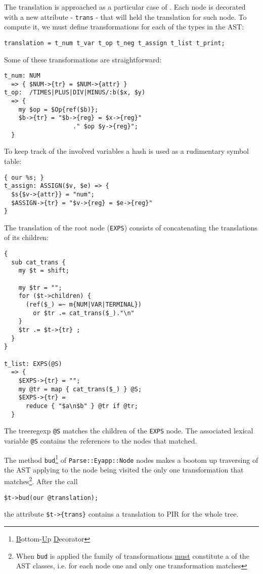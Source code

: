 The translation is approached as a particular case of 
. Each node is decorated with a new
attribute - \verb|trans| - that will held 
the translation for such node.
To compute it, we must define transformations
for each of the types in the AST:
\begin{verbatim}
translation = t_num t_var t_op t_neg t_assign t_list t_print;
\end{verbatim}

Some of these transformations are straightforward:
\begin{verbatim}
t_num: NUM 
  => { $NUM->{tr} = $NUM->{attr} }
t_op:  /TIMES|PLUS|DIV|MINUS/:b($x, $y)
  => {
    my $op = $Op{ref($b)};
    $b->{tr} = "$b->{reg} = $x->{reg}"
                   ." $op $y->{reg}";
  }
\end{verbatim}
To keep track of the involved variables
a hash is used as a rudimentary symbol table:
\begin{verbatim}
{ our %s; }
t_assign: ASSIGN($v, $e) => {
  $s{$v->{attr}} = "num";
  $ASSIGN->{tr} = "$v->{reg} = $e->{reg}"
}
\end{verbatim}
The translation of the root node (\verb|EXPS|)
consists of concatenating the translations
of its children:
\begin{verbatim}
{
  sub cat_trans {
    my $t = shift;

    my $tr = "";
    for ($t->children) {
      (ref($_) =~ m{NUM|VAR|TERMINAL})
        or $tr .= cat_trans($_)."\n"
    }
    $tr .= $t->{tr} ;
  }
}

t_list: EXPS(@S)
  => {
    $EXPS->{tr} = "";
    my @tr = map { cat_trans($_) } @S;
    $EXPS->{tr} =
      reduce { "$a\n$b" } @tr if @tr;
  }
\end{verbatim}
The treeregexp \verb|@S| matches the children
of the \verb|EXPS| node. The associated lexical variable \verb|@S| 
contains the references to the nodes that 
matched.

The method \verb|bud|\footnote{\underline{B}ottom-\underline{U}p \underline{D}ecorator}
of \verb|Parse::Eyapp::Node| nodes makes a bootom up traversing
of the AST applying to the node being visited the only one transformation that 
matches\footnote{When {\tt bud} is applied the family of transformations \underline{must} constitute
a  of the AST classes, i.e. for each node one and only one
transformation matches}.
After the call 
\begin{verbatim}
$t->bud(our @translation);
\end{verbatim}
the attribute \verb|$t->{trans}| contains 
a translation to PIR for the whole tree.
